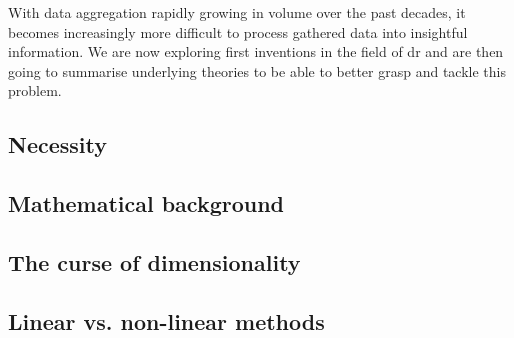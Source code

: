 With data aggregation rapidly growing in volume over the past decades, it becomes increasingly more difficult to process gathered data into insightful information.
We are now exploring first inventions in the field of \acrlong{dr} and are then going to summarise underlying theories to be able to better grasp and tackle this problem.


\subsection{Necessity}

\clearpage




\subsection{Mathematical background}

\clearpage


\subsection{The curse of dimensionality} \label{curseOfDimensionality}

\vfill
\clearpage


\subsection{Linear vs. non-linear methods}

\clearpage
